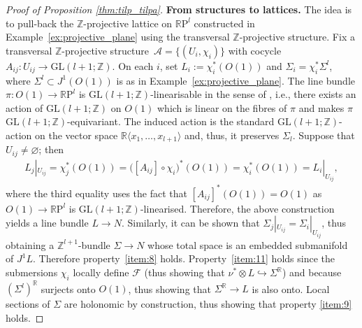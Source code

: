 \documentclass[10pt,a4paper]{amsart}
\numberwithin{equation}{section}
\newcommand{\RR}{\mathbb{R}}
\newcommand{\ZZ}{\mathbb{Z}}
\begin{document}
\begin{proof}[Proof of Proposition \ref{thm:tilp_tilpa}]
{\bf From structures to lattices.} The idea is to pull-back the $\ZZ$-projective lattice on $\RR\mathrm{P}^l$ constructed in Example~\ref{ex:projective_plane} using the transversal $\ZZ$-projective structure. Fix a transversal $\ZZ$-projective structure~$\mathcal{A} = \{(U_i,\chi_i)\}$ with cocycle $A_{ij} \colon U_{ij} \to \mathrm{GL}(l+1;\ZZ)$. On each $i$, set $L_i:= \chi^*_i(O(1))$ and $\Sigma_i = \chi^*_i \Sigma^l$, where $\Sigma^l \subset J^1(O(1))$ is as in Example~\ref{ex:projective_plane}. The line bundle $\pi \colon O(1) \to \RR\mathrm{P}^l$ is $\mathrm{GL}(l+1;\ZZ)$-linearisable in the sense of \cite{kklv}, i.e., there exists an action of $\mathrm{GL}(l+1;\ZZ)$ on $O(1)$ which is linear on the f\/ibres of $\pi$ and makes $\pi$ $\mathrm{GL}(l+1;\ZZ)$-equivariant. The induced action is the standard $\mathrm{GL}(l+1;\ZZ)$-action on the vector space $\RR \langle x_1,\ldots, x_{l+1} \rangle$ and, thus, it preserves $\Sigma_l$. Suppose that $U_{ij} \neq \varnothing$; then
 \begin{gather*}
 L_j|_{U_{ij}} = \chi^*_j (O(1)) = \big([A_{ij}] \circ \chi_i\big)^* (O(1)) = \chi_i^* (O(1)) = L_i|_{U_{ij}},
 \end{gather*}
where the third equality uses the fact that $[A_{ij}]^*(O(1)) = O(1)$ as $O(1) \to \RR\mathrm{P}^l$ is $\mathrm{GL}(l+1;\ZZ)$-linearised. Therefore, the above construction yields a line bundle $L \to N$. Similarly, it can be shown that $\Sigma_j|_{U_{ij}} = \Sigma_i|_{U_{ij}}$, thus obtaining a $\ZZ^{l+1}$-bundle $\Sigma \to N$ whose total space is an embedded submanifold of $J^1L$. Therefore property~\ref{item:8} holds. Property~\ref{item:11} holds since the submersions $\chi_i$ locally def\/ine $\mathcal{F}$ (thus showing that $\nu^* \otimes L \hookrightarrow \Sigma^{\RR}$) and because $\left(\Sigma^l\right)^{\RR}$ surjects onto $O(1)$, thus showing that $\Sigma^{\RR} \to L$ is also onto. Local sections of $\Sigma$ are holonomic by construction, thus showing that property \ref{item:9} holds.
\end{proof}
\end{document}
